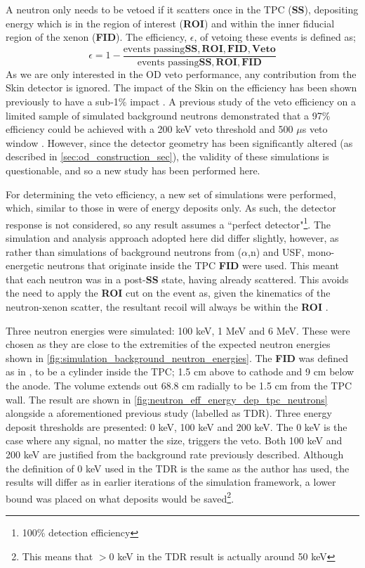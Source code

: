 \par
A neutron only needs to be vetoed if it scatters once in the TPC (\textbf{SS}), depositing energy which is in the region of interest (\textbf{ROI}) and within the inner fiducial region of the xenon (\textbf{FID}).
The efficiency, $\epsilon$, of vetoing these events is defined as;
\begin{equation}
    \epsilon = 1 - \frac{\text{events passing}\mathbf{SS, ROI, FID, Veto}}{\text{events passing}\mathbf{SS, ROI, FID}}
    \label{eq:neutron_efficiency}
\end{equation}
As we are only interested in the OD veto performance, any contribution from the Skin detector is ignored.
The impact of the Skin on the efficiency has been shown previously to have a sub-1\% impact \cite{sallyshaw_thesis_ref}.
A previous study of the veto efficiency on a limited sample of simulated background neutrons demonstrated that a 97\% efficiency could be achieved with a 200 keV veto threshold and 500 $\mu$s veto window \cite{LZ_TechnicalDesignReview_ref}.
However, since the detector geometry has been significantly altered (as described in \autoref{sec:od_construction_sec}), the validity of these simulations is questionable, and so a new study has been performed here.
\par
For determining the veto efficiency, a new set of simulations were performed, which, similar to those in \cite{LZ_TechnicalDesignReview_ref} were of energy deposits only.
As such, the detector response is not considered, so any result assumes a ``perfect detector"\footnote{100\% detection efficiency}.
The simulation and analysis approach adopted here did differ slightly, however, as rather than simulations of background neutrons from ($\alpha$,n) and USF, mono-energetic neutrons that originate inside the TPC \textbf{FID} were used.
This meant that each neutron was in a post-\textbf{SS} state, having already scattered.
This avoids the need to apply the \textbf{ROI} cut on the event as, given the kinematics of the neutron-xenon scatter, the resultant recoil will always be within the \textbf{ROI} \cite{xenon100_neutrons_ref}.
\par
Three neutron energies were simulated: 100 keV, 1 MeV and 6 MeV.
These were chosen as they are close to the extremities of the expected neutron energies shown in \autoref{fig:simulation_background_neutron_energies}.
The \textbf{FID} was defined as in \cite{LZ_TechnicalDesignReview_ref}, to be a cylinder inside the TPC; 1.5 cm above to cathode and 9 cm below the anode.
The volume extends out 68.8 cm radially to be 1.5 cm from the TPC wall.
The result are shown in \autoref{fig:neutron_eff_energy_dep_tpc_neutrons} alongside a aforementioned previous study (labelled as TDR).
Three energy deposit thresholds are presented: 0 keV, 100 keV and 200 keV.
The 0 keV is the case where any signal, no matter the size, triggers the veto.
Both 100 keV and 200 keV are justified from the background rate previously described.
Although the definition of 0 keV used in the TDR is the same as the author has used, the results will differ as in earlier iterations of the simulation framework, a lower bound was placed on what deposits would be saved\footnote{This means that $>$0 keV in the TDR result is actually around 50 keV}.

